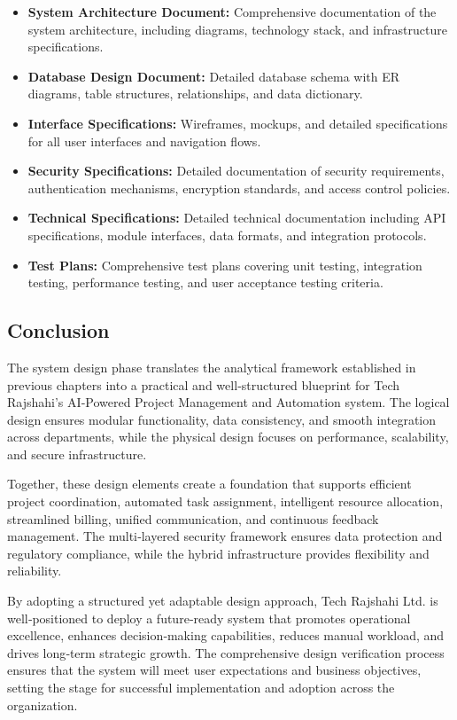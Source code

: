 \documentclass[12pt,a4paper]{article}
\begin{document}
\begin{itemize}
    \item \textbf{System Architecture Document:} Comprehensive documentation of the system architecture, including diagrams, technology stack, and infrastructure specifications.
    
    \item \textbf{Database Design Document:} Detailed database schema with ER diagrams, table structures, relationships, and data dictionary.
    
    \item \textbf{Interface Specifications:} Wireframes, mockups, and detailed specifications for all user interfaces and navigation flows.
    
    \item \textbf{Security Specifications:} Detailed documentation of security requirements, authentication mechanisms, encryption standards, and access control policies.
    
    \item \textbf{Technical Specifications:} Detailed technical documentation including API specifications, module interfaces, data formats, and integration protocols.
    
    \item \textbf{Test Plans:} Comprehensive test plans covering unit testing, integration testing, performance testing, and user acceptance testing criteria.
\end{itemize}

\subsection{Conclusion}
The system design phase translates the analytical framework established in previous chapters into a practical and well‑structured blueprint for Tech Rajshahi's AI‑Powered Project Management and Automation system.  The logical design ensures modular functionality, data consistency, and smooth integration across departments, while the physical design focuses on performance, scalability, and secure infrastructure.  

Together, these design elements create a foundation that supports efficient project coordination, automated task assignment, intelligent resource allocation, streamlined billing, unified communication, and continuous feedback management.  The multi‑layered security framework ensures data protection and regulatory compliance, while the hybrid infrastructure provides flexibility and reliability.

By adopting a structured yet adaptable design approach, Tech Rajshahi Ltd. is well‑positioned to deploy a future‑ready system that promotes operational excellence, enhances decision‑making capabilities, reduces manual workload, and drives long‑term strategic growth.  The comprehensive design verification process ensures that the system will meet user expectations and business objectives, setting the stage for successful implementation and adoption across the organization.
\end{document}
